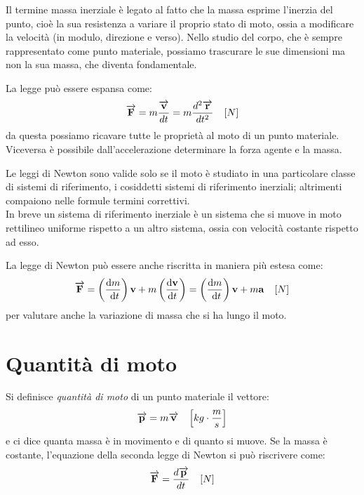 \documentclass[class=book, crop=false, oneside, 12pt]{standalone}
\begin{document}
Il termine massa inerziale è legato al fatto che la massa esprime l'inerzia del punto, cioè la sua resistenza a variare il proprio stato di moto, ossia a modificare la velocità (in modulo, direzione e verso).
Nello studio del corpo, che è sempre rappresentato come punto materiale, possiamo trascurare le sue dimensioni ma non la sua massa, che diventa fondamentale.

La legge può essere espansa come:
\begin{equation}
    \overrightarrow{\mathbf{F}} = m \frac{\overrightarrow{\mathbf{v}}}{dt} = m \frac{d^2 \overrightarrow{\mathbf{r}}}{dt^2} \ \udm{N} %
\end{equation}
da questa possiamo ricavare tutte le proprietà al moto di un punto materiale. Viceversa è possibile dall'accelerazione determinare la forza agente e la massa.

Le leggi di Newton sono valide solo se il moto è studiato in una particolare classe di sistemi di riferimento, i cosiddetti sistemi di riferimento inerziali; altrimenti compaiono nelle formule termini correttivi.\\
In breve un sistema di riferimento inerziale è un sistema che si muove in moto rettilineo uniforme rispetto a un altro sistema, ossia con velocità costante rispetto ad esso.

La legge di Newton può essere anche riscritta in maniera più estesa come:
\begin{equation}
    \overrightarrow{\mathbf{F}}=\left(\frac{\mathrm{d} m}{\mathrm{~d} t}\right) \mathbf{v}+m\left(\frac{\mathrm{d} \mathbf{v}}{\mathrm{d} t}\right)=\left(\frac{\mathrm{d} m}{\mathrm{~d} t}\right) \mathbf{v}+m \mathbf{a} \ \udm{N}
\end{equation}
per valutare anche la variazione di massa che si ha lungo il moto.

\section{Quantità di moto}
Si definisce \emph{quantità di moto} di un punto materiale il vettore:
\begin{equation}
    \overrightarrow{\mathbf{p}} = m \overrightarrow{\mathbf{v}} \ \udm{kg \cdot \frac{m}{s}}
\end{equation}
e ci dice quanta massa è in movimento e di quanto si muove.
Se la massa è costante, l'equazione della seconda legge di Newton si può riscrivere come:
\begin{equation}
    \overrightarrow{\mathbf{F}} = \frac{d \overrightarrow{\mathbf{p}}}{dt} \ \udm{N}
\end{equation}
\end{document}

